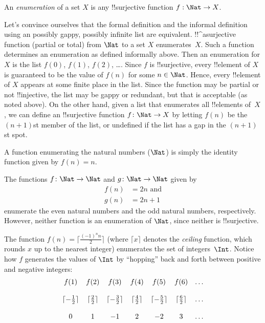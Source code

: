 \documentclass[../../include/open-logic-section]{subfiles}
\begin{document}
\begin{defn}
An \emph{enumeration} of a set $X$ is any !!{surjective} function $f: 
\Nat \rightarrow X$.
\end{defn}

\begin{explain}
Let's convince ourselves that the formal definition and the informal
definition using an possibly gappy, possibly infinite list are
equivalent. !!^a{surjective} function (partial or total) from $\Nat$ to
a set $X$ enumerates~$X$. Such a function determines an enumeration as
defined informally above. Then an enumeration for $X$ is the list
$f(0)$, $f(1)$, $f(2)$, \dots. Since $f$ is !!{surjective}, every
!!{element} of $X$ is guaranteed to be the value of $f(n)$ for some $n
\in \Nat$.  Hence, every !!{element} of $X$ appears at some finite
place in the list. Since the function may be partial or not !!{injective},
the list may be gappy or redundant, but that is acceptable (as noted
above). On the other hand, given a list that enumerates all
!!{element}s of~$X$, we can define an !!{surjective} function $f\colon
\Nat \to X$ by letting $f(n)$ be the $(n+1)$st member of the list, or
undefined if the list has a gap in the $(n+1)$st spot.
\end{explain}

\begin{ex}
A function enumerating the natural numbers ($\Nat$) is 
simply the identity function given by $f(n) = n$.
\end{ex}

\begin{ex}
The functions $f\colon \Nat \to \Nat$ and $g \colon \Nat \to \Nat$ given by
\begin{align}
f(n) & = 2n \text{ and}\\
g(n) & = 2n+1
\end{align}
enumerate the even natural numbers and the odd natural numbers, 
respectively. However, neither function is an enumeration of 
$\Nat$, since neither is !!{surjective}.
\end{ex}

\begin{ex}
The function $f(n) = \lceil \frac{(-1)^n n}{2}\rceil$ (where $\lceil x
\rceil$ denotes the \emph{ceiling} function, which rounds $x$ up to
the nearest integer) enumerates the set of integers~$\Int$. Notice
how $f$ generates the values of $\Int$ by ``hopping'' back and forth
between positive and negative integers: 
\[
\begin{array}{c c c c c c c}
f(1) & f(2) & f(3) & f(4) & f(5) & f(6) & \dots \\ \\
\lceil - \tfrac{1}{2}\rceil & \lceil \tfrac{2}{2} \rceil & \lceil - 
\tfrac{3}{2} \rceil & \lceil \tfrac{4}{2} \rceil  & \lceil -\tfrac{5}{2} 
\rceil & \lceil \tfrac{6}{2} \rceil & \dots \\ \\
0 & 1 & -1 & 2 & -2 & 3 & \dots
\end{array}
\]
\end{ex}
\end{document}

